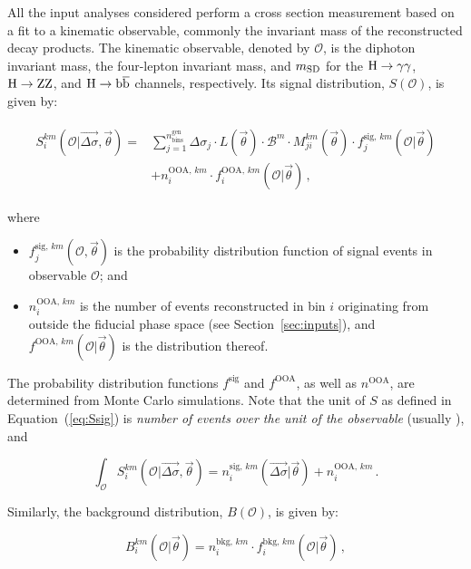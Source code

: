 All the input analyses considered perform a cross section measurement based on a fit to a kinematic observable, commonly the invariant mass of the reconstructed decay products.
% 
The kinematic observable, denoted by $\mathcal{O}$, is the diphoton invariant mass, the four-lepton invariant mass, and $m_\mathrm{SD}$ for the $\mathrm{H}\to\mathrm{\gamma}\mathrm{\gamma}$, $\mathrm{H}\to\mathrm{Z}\mathrm{Z}$, and $\mathrm{H}\to\mathrm{b}\overline{\mathrm{b}}$ channels, respectively.
% 
Its signal distribution, $S(\mathcal{O})$, is given by:
% 
\begin{linenomath*}
\begin{align}
\begin{split}
S^{km}_{i}( \mathcal{O} | \vec{\Delta\sigma}, \vec{\theta})
= &
    \sum_{j=1}^{n_\text{bins}^\text{gen}}
        \Delta\sigma_j \cdot L(\vec{\theta}) \cdot \mathcal{B}^{m}
        \cdot M_{ji}^{km}(\vec{\theta})
        \cdot f_{j}^{\text{sig},\,km}( \mathcal{O} | \vec{\theta} )
    \\ &
    + n^{\text{OOA},\,km}_i
        \cdot f^{\text{OOA},\,km}_i( \mathcal{O} | \vec{\theta} )
\,,
%
\label{eq:Ssig}
\end{split}
\end{align}
\end{linenomath*}
% 
where
% 
\begin{itemize}
% 
\item $f_{j}^{\text{sig},\,km}(\mathcal{O},\vec{\theta})$ is the probability distribution function of signal events in observable $\mathcal{O}$; and
% 
\item $n^{\text{OOA},\,km}_i$ is the number of events reconstructed in bin $i$ originating from outside the fiducial phase space (see Section~\ref{sec:inputs}), and $f^{\text{OOA},\,km}( \mathcal{O} | \vec{\theta} )$ is the distribution thereof.
% 
\end{itemize}
% 
The probability distribution functions $f^\text{sig}$ and $f^\text{OOA}$, as well as $n^\text{OOA}$, are determined from Monte Carlo simulations.
% 
Note that the unit of $S$ as defined in Equation~(\ref{eq:Ssig}) is \textit{number of events over the unit of the observable} (usually \GeV), and
% 
\begin{linenomath*}
\begin{equation}
\int_\mathcal{O} S_i^{km}( \mathcal{O} | \vec{\Delta\sigma}, \vec{\theta})
    = n_i^{\text{sig},\,km}(\vec{\Delta\sigma} | \vec{\theta})
      + n^{\text{OOA},\,km}_i
\,.
\end{equation}
\end{linenomath*}
% 
Similarly, the background distribution, $B(\mathcal{O})$, is given by:
% 
\begin{linenomath*}
\begin{equation}
B^{km}_i(\mathcal{O}|\vec{\theta})
= n^{\text{bkg},\,km}_i
    \cdot f^{\text{bkg},\,km}_i(\mathcal{O}|\vec{\theta})
\,,
\end{equation}
\end{linenomath*}
